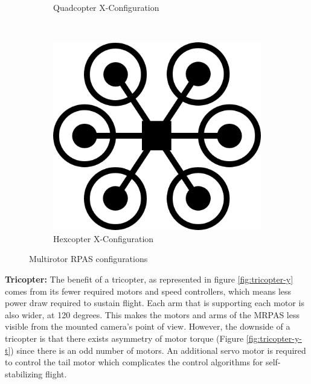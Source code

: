 \begin{figure}[H]
\begin{subfigure}[b]{0.3\textwidth}
        \caption{Quadcopter X-Configuration}
        \label{fig:quadcopter-x}
    \end{subfigure}
    ~
    \begin{subfigure}[b]{0.3\textwidth}
        \centering
        \includegraphics[scale=0.4]{img/drone_hexconfig}
        \caption{Hexcopter X-Configuration}
        \label{fig:hexcopter-x}
    \end{subfigure}
    
    \caption{Multirotor RPAS configurations}
    \label{fig:rpas_configs}
\end{figure}

\textbf{Tricopter: }The benefit of a tricopter, as represented in figure \ref{fig:tricopter-y} comes from its fewer required motors and speed controllers,
which means less power draw required to sustain flight. Each arm that is supporting each motor is also wider, at 120 
degrees. This makes the motors and arms of the MRPAS less visible from the mounted camera's point of view. 
However, the downside of a tricopter is that there exists asymmetry of motor torque (Figure \ref{fig:tricopter-y-t}) since 
there is an odd number of motors. An additional servo motor is required to control the tail motor which 
complicates the control algorithms for self-stabilizing flight.

